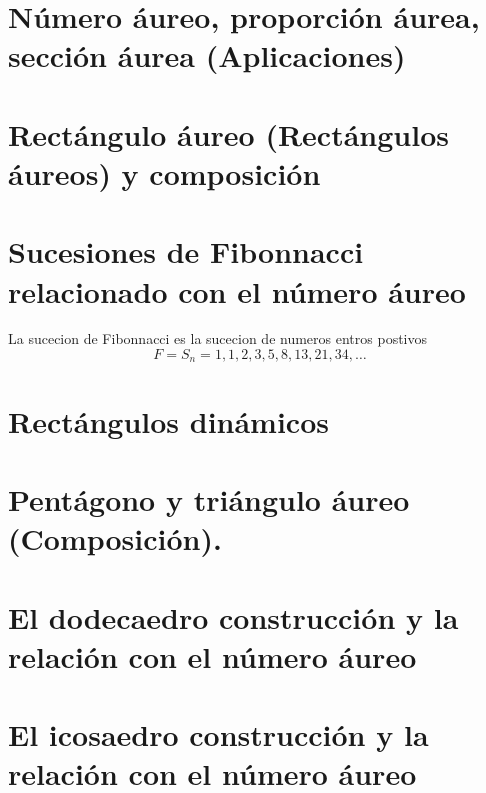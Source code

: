 \documentclass[
  11pt,
]{krantz}
\theoremstyle{definition}
\theoremstyle{definition}
\theoremstyle{definition}
\theoremstyle{definition}
\theoremstyle{remark}
\begin{document}
\hypertarget{nuxfamero-uxe1ureo-proporciuxf3n-uxe1urea-secciuxf3n-uxe1urea-aplicaciones}{%
\section{Número áureo, proporción áurea, sección áurea (Aplicaciones)}\label{nuxfamero-uxe1ureo-proporciuxf3n-uxe1urea-secciuxf3n-uxe1urea-aplicaciones}}

\hypertarget{rectuxe1ngulo-uxe1ureo-rectuxe1ngulos-uxe1ureos-y-composiciuxf3n}{%
\section{Rectángulo áureo (Rectángulos áureos) y composición}\label{rectuxe1ngulo-uxe1ureo-rectuxe1ngulos-uxe1ureos-y-composiciuxf3n}}

\hypertarget{sucesiones-de-fibonnacci-relacionado-con-el-nuxfamero-uxe1ureo}{%
\section{Sucesiones de Fibonnacci relacionado con el número áureo}\label{sucesiones-de-fibonnacci-relacionado-con-el-nuxfamero-uxe1ureo}}

La sucecion de Fibonnacci es la sucecion de numeros entros postivos
\[F=S_n={1,1,2,3,5,8,13,21,34, \ldots}\]

\hypertarget{rectuxe1ngulos-dinuxe1micos}{%
\section{Rectángulos dinámicos}\label{rectuxe1ngulos-dinuxe1micos}}

\hypertarget{pentuxe1gono-y-triuxe1ngulo-uxe1ureo-composiciuxf3n.}{%
\section{Pentágono y triángulo áureo (Composición).}\label{pentuxe1gono-y-triuxe1ngulo-uxe1ureo-composiciuxf3n.}}

\hypertarget{el-dodecaedro-construcciuxf3n-y-la-relaciuxf3n-con-el-nuxfamero-uxe1ureo}{%
\section{El dodecaedro construcción y la relación con el número áureo}\label{el-dodecaedro-construcciuxf3n-y-la-relaciuxf3n-con-el-nuxfamero-uxe1ureo}}

\hypertarget{el-icosaedro-construcciuxf3n-y-la-relaciuxf3n-con-el-nuxfamero-uxe1ureo}{%
\section{El icosaedro construcción y la relación con el número áureo}\label{el-icosaedro-construcciuxf3n-y-la-relaciuxf3n-con-el-nuxfamero-uxe1ureo}}
\end{document}
